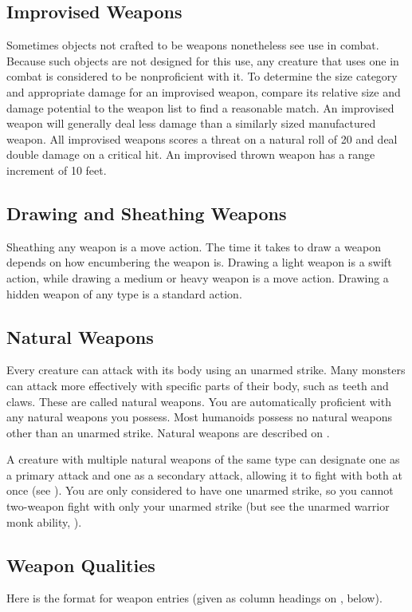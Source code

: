 \subsection{Improvised Weapons} Sometimes objects not crafted to be weapons nonetheless see use in combat. Because such objects are not designed for this use, any creature that uses one in combat is considered to be nonproficient with it. To determine the size category and appropriate damage for an improvised weapon, compare its relative size and damage potential to the weapon list to find a reasonable match. An improvised weapon will generally deal less damage than a similarly sized manufactured weapon. All improvised weapons scores a threat on a natural roll of 20 and deal double damage on a critical hit. An improvised thrown weapon has a range increment of 10 feet.

\subsection{Drawing and Sheathing Weapons}\label{Drawing and Sheathing Weapons}
Sheathing any weapon is a move action. The time it takes to draw a weapon depends on how encumbering the weapon is. Drawing a light weapon is a swift action, while drawing a medium or heavy weapon is a move action. Drawing a hidden weapon of any type is a standard action. 

\subsection{Natural Weapons}\label{Natural Weapons}
Every creature can attack with its body using an unarmed strike. Many monsters can attack more effectively with specific parts of their body, such as teeth and claws. These are called natural weapons. You are automatically proficient with any natural weapons you possess. Most humanoids possess no natural weapons other than an unarmed strike. Natural weapons are described on .

A creature with multiple natural weapons of the same type can designate one as a primary attack and one as a secondary attack, allowing it to fight with both at once (see ). You are only considered to have one unarmed strike, so you cannot two-weapon fight with only your unarmed strike (but see the unarmed warrior monk ability, ).

\subsection{Weapon Qualities}
Here is the format for weapon entries (given as column headings on , below).

